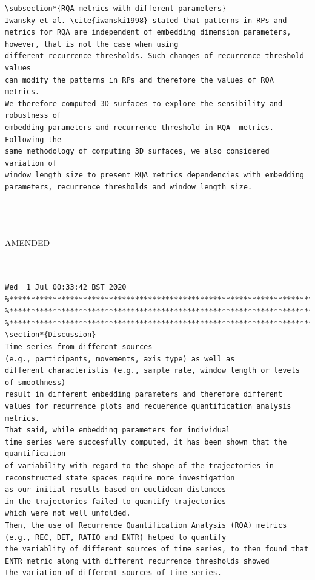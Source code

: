 \documentclass[10pt]{article}
\begin{document}
\begin{enumerate}
\begin{verbatim}
\subsection*{RQA metrics with different parameters}
Iwansky et al. \cite{iwanski1998} stated that patterns in RPs and 
metrics for RQA are independent of embedding dimension parameters, 
however, that is not the case when using 
different recurrence thresholds. Such changes of recurrence threshold values 
can modify the patterns in RPs and therefore the values of RQA metrics.
We therefore computed 3D surfaces to explore the sensibility and robustness of 
embedding parameters and recurrence threshold in RQA  metrics. Following the 
same methodology of computing 3D surfaces, we also considered variation of 
window length size to present RQA metrics dependencies with embedding 
parameters, recurrence thresholds and window length size.




\end{verbatim}
AMENDED

\begin{verbatim}


Wed  1 Jul 00:33:42 BST 2020 
%*******************************************************************************
%*******************************************************************************
%*******************************************************************************
\section*{Discussion}
Time series from different sources  
(e.g., participants, movements, axis type) as well as
different characteristis (e.g., sample rate, window length or levels of smoothness) 
result in different embedding parameters and therefore different 
values for recurrence plots and recuerence quantification analysis metrics.
That said, while embedding parameters for individual
time series were succesfully computed, it has been shown that the quantification 
of variability with regard to the shape of the trajectories in 
reconstructed state spaces require more investigation
as our initial results based on euclidean distances 
in the trajectories failed to quantify trajectories 
which were not well unfolded. 
Then, the use of Recurrence Quantification Analysis (RQA) metrics 
(e.g., REC, DET, RATIO and ENTR) helped to quantify 
the variablity of different sources of time series, to then found that 
ENTR metric along with different recurrence thresholds showed 
the variation of different sources of time series.






\end{verbatim}
\end{enumerate}
\end{document}
